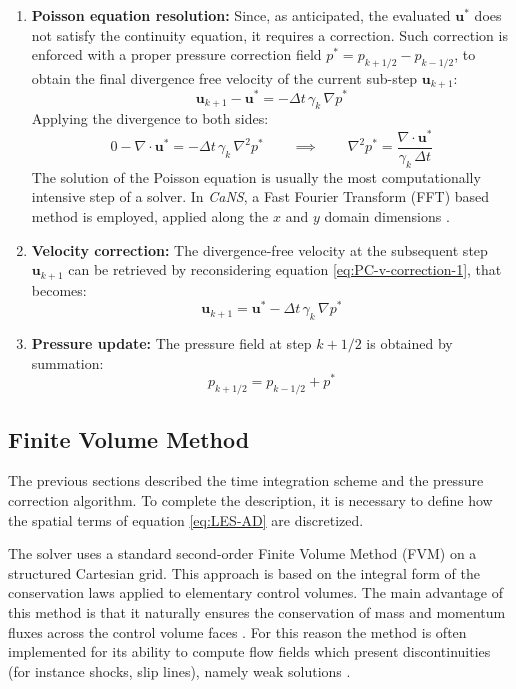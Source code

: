 \documentclass[12pt, a4paper, twoside, openright]{book}
\begin{document}
\begin{enumerate}
\item \textbf{Poisson equation resolution:} Since, as anticipated, the evaluated $\bm{u}^*$ does not satisfy the continuity equation, it requires a correction. Such correction is enforced with a proper pressure correction field $p^* = p_{k+1/2} - p_{k-1/2}$, to obtain the final divergence free velocity of the current sub-step $\bm{u}_{k+1}$:
\begin{equation}
	\bm{u}_{k+1} - \bm{u}^* = - \Delta t \, \gamma_k \, \nabla p^*
	\label{eq:PC-v-correction-1}
\end{equation}
Applying the divergence to both sides:
\begin{equation}
	0 - \nabla \cdot \bm{u}^* = - \Delta t \, \gamma_k \, \nabla^2 p^* 
	\qquad \implies \qquad
	\nabla^2 p^* = \dfrac{\nabla \cdot \bm{u}^*}{\gamma_k \, \Delta t}
\end{equation}
The solution of the Poisson equation is usually the most computationally intensive step of a solver. In \textit{CaNS}, a Fast Fourier Transform (FFT) based method is employed, applied along the $x$ and $y$ domain dimensions \cite{cans-costa}.

\item \textbf{Velocity correction:} The divergence-free velocity at the subsequent step $\bm{u}_{k+1}$ can be retrieved by reconsidering equation \eqref{eq:PC-v-correction-1}, that becomes:
\begin{equation}
	\bm{u}_{k+1} = \bm{u}^* - \Delta t \, \gamma_k \, \nabla p^*
\end{equation}

\item \textbf{Pressure update:} The pressure field at step $k+1/2$ is obtained by summation:
\begin{equation}
	p_{k+1/2} = p_{k-1/2} + p^*
\end{equation}

\end{enumerate}

\subsection{Finite Volume Method}
\label{sec:FVM}
The previous sections described the time integration scheme and the pressure correction algorithm. To complete the description, it is necessary to define how the spatial terms of equation \eqref{eq:LES-AD} are discretized.

The solver uses a standard second-order Finite Volume Method (FVM) on a structured Cartesian grid. This approach is based on the integral form of the conservation laws applied to elementary control volumes. The main advantage of this method is that it naturally ensures the conservation of mass and momentum fluxes across the control volume faces \cite{cfd-anderson}. For this reason the method is often implemented for its ability to compute flow fields which present discontinuities (for instance shocks, slip lines), namely weak solutions \cite{cfd-blazek}.
\end{document}
